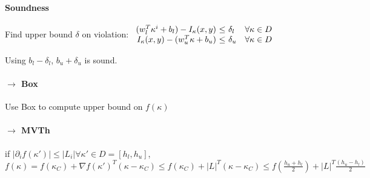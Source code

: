 \paragraph{Soundness}
Find upper bound $\delta$ on violation: 
$\begin{array}{r@{~\le~}ll}
(w_l^T\kappa^i + b_l) - I_\kappa(x, y) & \delta_l &\forall \kappa \in D \\
 I_\kappa(x, y) - (w_u^T\kappa + b_u) & \delta_u &\forall \kappa \in D
\end{array}$

Using $b_l-\delta_l$, $b_u+\delta_u$ is sound. 

\paragraph{$\rightarrow$ Box}
Use Box to compute upper bound on $f(\kappa)$

\paragraph{$\rightarrow$ MVTh} if $\lvert \partial_i f(\kappa') \rvert \le \lvert L_i \rvert \forall \kappa' \in D = [h_l, h_u]$, 
$f(\kappa) = f(\kappa_C) + \nabla f(\kappa')^T(\kappa-\kappa_C) \le f(\kappa_C) + \lvert L \rvert^T (\kappa - \kappa_C) \le f\left(\frac{h_u+h_l}{2}\right) + \lvert L \rvert^T \frac{(h_u-h_l)}{2}$
